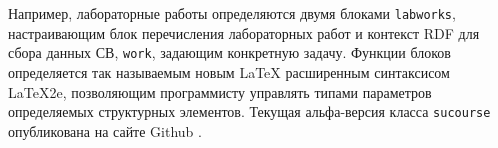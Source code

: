 \documentclass[
]{aiitart}
\begin{document}


Например, лабораторные работы определяются двумя блоками \verb|labworks|, настраивающим блок перечисления лабораторных работ и контекст RDF для сбора данных СВ, \verb|work|, задающим конкретную задачу. Функции блоков определяется так называемым новым \LaTeX{} расширенным синтаксисом \LaTeX2e, позволяющим программисту управлять типами параметров определяемых структурных элементов. Текущая альфа-версия класса \verb|sucourse| опубликована на сайте Github \cite{ghs}.
\end{document}
